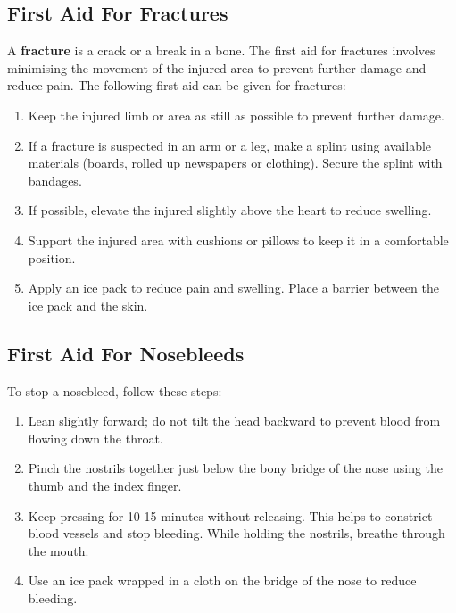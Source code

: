 \subsection{First Aid For Fractures}
A \textbf{fracture} is a crack or a break in a bone. The first aid for fractures involves minimising the movement of the injured area to prevent further damage and reduce pain. The following first aid can be given for fractures:
\begin{enumerate}
    \item Keep the injured limb or area as still as possible to prevent further damage.
    \item If a fracture is suspected in an arm or a leg, make a splint using available materials (boards, rolled up newspapers or clothing). Secure the splint with bandages.
    \item If possible, elevate the injured slightly above the heart to reduce swelling.
    \item Support the injured area with cushions or pillows to keep it in a comfortable position.
    \item Apply an ice pack to reduce pain and swelling. Place a barrier between the ice pack and the skin.
\end{enumerate}
\vspace{0.7in}
\subsection{First Aid For Nosebleeds}
To stop a nosebleed, follow these steps:
\begin{enumerate}
    \item Lean slightly forward; do not tilt the head backward to prevent blood from flowing down the throat.
    \item Pinch the nostrils together just below the bony bridge of the nose using the thumb and the index finger.
    \item Keep pressing for 10-15 minutes without releasing. This helps to constrict blood vessels and stop bleeding. While holding the nostrils, breathe through the mouth.
    \item Use an ice pack wrapped in a cloth on the bridge of the nose to reduce bleeding.
\end{enumerate}
